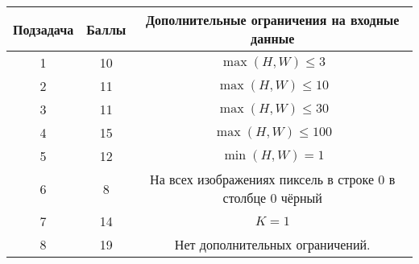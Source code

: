 \begin{center}
\renewcommand{\arraystretch}{1.5}
\begin{tabular}{|c|c|c|}
\hline
Подзадача & Баллы & Дополнительные ограничения на входные данные\\
\hline
1 & 10 & $\max(H, W) \leq 3$ \\
\hline
2 & 11 & $\max(H, W) \leq 10$ \\
\hline
3 & 11 & $\max(H, W) \leq 30$ \\
\hline
4 & 15 & $\max(H, W) \leq 100$\\
\hline
5 & 12 & $\min(H, W)=1$ \\
\hline
6 & 8 & На всех изображениях пиксель в строке $0$ в столбце $0$ чёрный \\
\hline
7 & 14 & $K=1$ \\
\hline
8 & 19 & Нет дополнительных ограничений. \\
\hline
\end{tabular}
\end{center}
